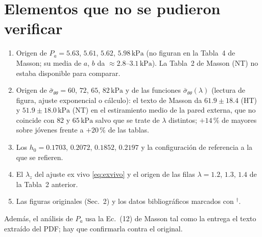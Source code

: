 \documentclass[11pt]{article}
\newcommand{\kPa}{\,\mathrm{kPa}}
\newcommand{\sbar}{\bar\sigma_{\theta\theta}}
\begin{document}
\section{Elementos que no se pudieron verificar}\label{sec:pend}
\begin{enumerate}
\item Origen de $P_a=5.63$, $5.61$, $5.62$, $5.98\kPa$ (no figuran en la Tabla~4 de Masson; su media de $a$, $b$ da $\approx2.8$--$3.1\kPa$). La Tabla~2 de Masson (NT) no estaba disponible para comparar.
\item Origen de $\sbar=60$, $72$, $65$, $82\kPa$ y de las funciones $\sbar(\lambda)$ (lectura de figura, ajuste exponencial o cálculo): el texto de Masson da $61.9\pm18.4$ (HT) y $51.9\pm18.0\kPa$ (NT) en el estiramiento medio de la pared externa, que no coincide con $82$ y $65\kPa$ salvo que se trate de $\lambda$ distintos; $+14\,\%$ de mayores sobre jóvenes frente a $+20\,\%$ de las tablas.
\item Los $h_0=0.1703$, $0.2072$, $0.1852$, $0.2197$ y la configuración de referencia a la que se refieren.
\item El $\lambda_z$ del ajuste ex vivo \eqref{eq:exvivo} y el origen de las filas $\lambda=1.2$, $1.3$, $1.4$ de la Tabla~2 anterior.
\item Las figuras originales (Sec.~2) y los datos bibliográficos marcados con $^\dagger$.
\end{enumerate}
Además, el análisis de $P_a$ usa la Ec.~(12) de Masson tal como la entrega el texto extraído del PDF; hay que confirmarla contra el original.
\end{document}
